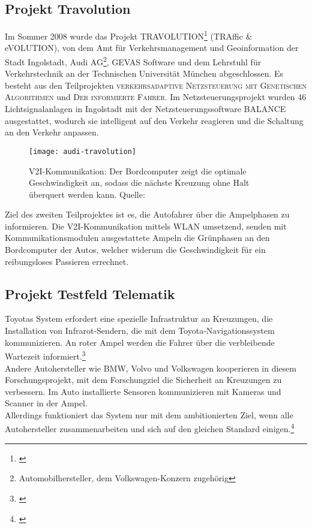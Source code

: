 \subsection{Projekt Travolution}
Im Sommer 2008 wurde das Projekt TRAVOLUTION\footnote{\cite{Travolution}} (TRAffic \& eVOLUTION), von dem Amt für Verkehrsmanagement und Geoinformation der Stadt Ingolstadt, Audi AG\footnote{Automobilhersteller, dem Volkswagen-Konzern zugehörig}, GEVAS Software und dem Lehrstuhl für Verkehrstechnik an der Technischen Universität München abgeschlossen. Es besteht aus den Teilprojekten \textsc{verkehrsadaptive Netzsteuerung mit Genetischen Algorithmen} und \textsc{Der informierte Fahrer}. Im Netzsteuerungsprojekt wurden 46 Lichtsignalanlagen in Ingolstadt mit der Netzsteuerungssoftware BALANCE ausgestattet, wodurch sie intelligent auf den Verkehr reagieren und die Schaltung an den Verkehr anpassen. 
\begin{figure}[H]  
    \centering  
    \texttt{[image: audi-travolution]}
    \label{fig:travolution}
    \caption[Projekt Travolution]{\gls{V2I}-Kommunikation: Der Bordcomputer zeigt die optimale Geschwindigkeit an, sodass die nächste Kreuzung ohne Halt überquert werden kann. Quelle: \cite{AudiTravolution}}
\end{figure}
Ziel des zweiten Teilprojektes ist es, die Autofahrer über die Ampelphasen zu informieren. Die \gls{V2I}-Kommunikation mittels WLAN umsetzend, senden mit Kommunikationsmodulen ausgestattete Ampeln die Grünphasen an den Bordcomputer der Autos, welcher widerum die Geschwindigkeit für ein reibungsloses Passieren errechnet.
\subsection{Projekt Testfeld Telematik}
Toyotas System erfordert eine spezielle Infrastruktur an Kreuzungen, die Installation von Infrarot-Sendern, die mit dem Toyota-Navigationssystem kommunizieren. An roter Ampel werden die Fahrer über die verbleibende Wartezeit informiert.\footnote{\cite{Toyota}}\\
Andere Autohersteller wie BMW, Volvo und Volkswagen kooperieren in diesem Forschungsprojekt, mit dem Forschungziel die Sicherheit an Kreuzungen zu verbessern. Im Auto installierte Sensoren kommunizieren mit Kameras und Scanner in der Ampel. \\
Allerdings funktioniert das System nur mit dem ambitionierten Ziel, wenn alle Autohersteller zusammenarbeiten und sich auf den gleichen Standard einigen.\footnote{\cite{Siemens}}
